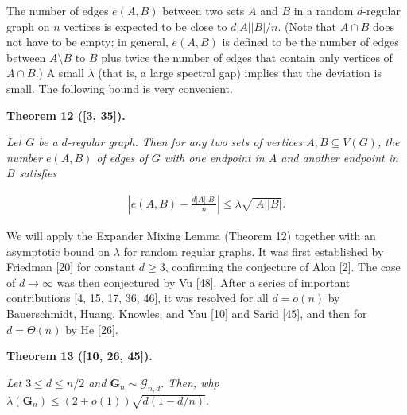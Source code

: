 The number of edges $e(A,B)$ between two sets $A$ and $B$ in a random $d$-regular graph on $n$ vertices is expected to be close to $d|A||B|/n$. (Note that $A\cap B$ does not have to be empty; in general, $e(A,B)$ is defined to be the number of edges between $A\setminus B$ to $B$ plus twice the number of edges that contain only vertices of $A\cap B$.) A small $\lambda$ (that is, a large spectral gap) implies that the deviation is small. The following bound is very convenient.\par





\par\medskip\noindent\textbf{
\textbf{Theorem 12}\textbf{ }([3, 35])\textbf{.}
}\par



\emph{Let $G$ be a $d$-regular graph. Then for any two sets of vertices $A,B\subseteq V(G)$, the number $e(A,B)$ of edges of $G$ with one endpoint in $A$ and another endpoint in $B$ satisfies}\par


\[\begin{gathered}
\left|e(A,B)-\frac{d|A||B|}{n}\right|\leq\lambda\sqrt{|A||B|}.
\end{gathered}\]






We will apply the Expander Mixing Lemma (Theorem 12) together with an asymptotic bound on $\lambda$ for random regular graphs. It was first established by Friedman [20] for constant $d\geq 3$, confirming the conjecture of Alon [2]. The case of $d\to\infty$ was then conjectured by Vu [48]. After a series of important contributions [4, 15, 17, 36, 46], it was resolved for all $d=o(n)$ by Bauerschmidt, Huang, Knowles, and Yau [10] and Sarid [45], and then for $d=\Theta(n)$ by He [26].\par





\par\medskip\noindent\textbf{
\textbf{Theorem 13}\textbf{ }([10, 26, 45])\textbf{.}
}\par



\emph{Let $3\leq d\leq n/2$ and $\mathbf{G}_{n}\sim\mathcal{G}_{n,d}$. Then, whp $\lambda(\mathbf{G}_{n})\leq(2+o(1))\sqrt{d(1-d/n)}$.}\par



